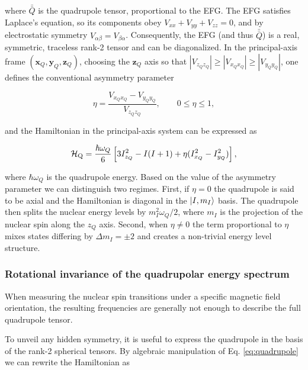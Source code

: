 \noindent where $\bar{\bar{Q}}$ is the quadrupole tensor, proportional to the EFG. The EFG satisfies Laplace's equation, so its components obey $V_{xx}+V_{yy}+V_{zz}=0$, and by electrostatic symmetry $V_{\alpha\beta}=V_{\beta\alpha}$. Consequently, the EFG (and thus $\bar{\bar{Q}}$) is a real, symmetric, traceless rank-2 tensor and can be diagonalized. In the principal-axis frame $(\mathbf{x}_Q,\mathbf{y}_Q,\mathbf{z}_Q)$, choosing the $\mathbf{z}_Q$ axis so that $|V_{z_Qz_Q}|\ge|V_{x_Qx_Q}|\ge|V_{y_Qy_Q}|$, one defines the conventional asymmetry parameter

\begin{equation}
    \eta = \frac{V_{x_Qx_Q}-V_{y_Qy_Q}}{V_{z_Qz_Q}}, \qquad 0\leq\eta\leq1,
\end{equation}

\noindent and the Hamiltonian in the principal-axis system can be expressed as

\begin{equation}
\mathcal{H}_{\text{Q}} = \frac{\hbar \omega_Q}{6}\left[ 3 I_{z_Q}^2 - I(I+1) + \eta(I_{x_Q}^2 - I_{y_Q}^2)\right],
\end{equation}

where $\hbar \omega_Q$ is the quadrupole energy. Based on the value of the asymmetry parameter we can distinguish two regimes. First, if $\eta=0$ the quadrupole is said to be axial and the Hamiltonian is diagonal in the $\ket{I,m_I}$ basis. The quadrupole then splits the nuclear energy levels by $m_I^2 \omega_Q/2 $, where $m_I$ is the projection of the nuclear spin along the $z_Q$ axis. Second, when $\eta\neq0$ the term proportional to $\eta$ mixes states differing by $\Delta m_I=\pm2$ and creates a non-trivial energy level structure. 


\subsubsection{Rotational invariance of the quadrupolar energy spectrum}

When measuring the nuclear spin transitions under a specific magnetic field orientation, the resulting frequencies are generally not enough to describe the full quadrupole tensor. 

To unveil any hidden symmetry, it is useful to express the quadrupole in the basis of the rank-2 spherical tensors. By algebraic manipulation of Eq. \ref{eq:quadrupole} we can rewrite the Hamiltonian as

